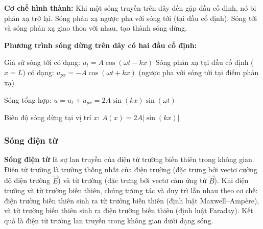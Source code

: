 \textbf{Cơ chế hình thành:} Khi một sóng truyền trên dây đến gặp đầu cố định, nó bị phản xạ trở lại. Sóng phản xạ ngược pha với sóng tới (tại đầu cố định). Sóng tới và sóng phản xạ giao thoa với nhau, tạo thành sóng dừng.

\textbf{Phương trình sóng dừng trên dây có hai đầu cố định:}

Giả sử sóng tới có dạng: $u_t = A\cos(\omega t - kx)$
Sóng phản xạ tại đầu cố định ($x = L$) có dạng: $u_{px} = -A\cos(\omega t + kx)$ (ngược pha với sóng tới tại điểm phản xạ)

Sóng tổng hợp: $u = u_t + u_{px} = 2A\sin(kx)\sin(\omega t)$

Biên độ sóng dừng tại vị trí $x$: $A(x) = 2A|\sin(kx)|$

\begin{center}
\end{center}

\subsubsection{Sóng điện từ}

\textbf{Sóng điện từ} là sự lan truyền của điện từ trường biến thiên trong không gian. Điện từ trường là trường thống nhất của điện trường (đặc trưng bởi vectơ cường độ điện trường $\vec{E}$) và từ trường (đặc trưng bởi vectơ cảm ứng từ $\vec{B}$). Khi điện trường và từ trường biến thiên, chúng tương tác và duy trì lẫn nhau theo cơ chế: điện trường biến thiên sinh ra từ trường biến thiên (định luật Maxwell–Ampère), và từ trường biến thiên sinh ra điện trường biến thiên (định luật Faraday). Kết quả là điện từ trường lan truyền trong không gian dưới dạng sóng.

